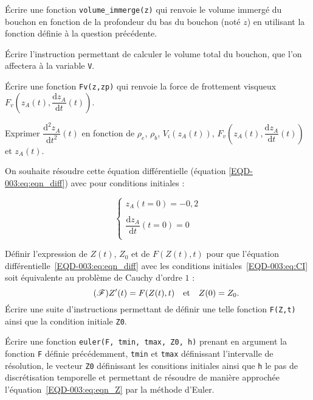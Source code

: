 \question{} Écrire une fonction \texttt{volume\_immerge(z)} qui renvoie le volume immergé du bouchon en fonction de la profondeur du bas du bouchon (noté $z$) en utilisant la fonction définie à la question précédente.

\question{} Écrire l'instruction permettant de calculer le volume total du bouchon, que l'on affectera à la variable \texttt V.

\question{} Écrire une fonction \texttt{Fv(z,zp)} qui renvoie la force de frottement visqueux $F_v\left(z_A(t),\dfrac{\mathrm{d}z_A}{\mathrm{d}t}(t)\right)$. 

\question{} Exprimer $\dfrac{\mathrm{d}^2z_A}{\mathrm{d}t^2}(t)$ en fonction de $\rho_{e}$, $\rho_b$, $V_i(z_A(t))$, $F_v\left(z_A(t),\dfrac{\mathrm{d}z_A}{\mathrm{d}t}(t)\right)$ et $z_A(t)$. 


On souhaite résoudre cette équation différentielle (équation \ref{EQD-003:eq:eqn_diff}) avec pour conditions initiales : 

\begin{equation}\tag{CI}\label{EQD-003:eq:CI}
\left\{
\begin{array}{l}
z_A(t=0)=-0,2\\
\\
\dfrac{\mathrm{d}z_A}{\mathrm{d}t}(t=0)=0\\
\end{array}
\right.
\end{equation}

\question{} Définir l'expression de $Z(t)$, $Z_0$ et de $F(Z(t),t)$ pour que l'équation différentielle~\eqref{EQD-003:eq:eqn_diff} avec les conditions initiales~\eqref{EQD-003:eq:CI} soit équivalente au problème de Cauchy d'ordre $1$ : 
\begin{equation}\tag{$\mathscr{F}$}\label{EQD-003:eq:eqn_Z}
    Z'(t)=F(Z(t),t)\quad\textrm{et}\quad Z(0) = Z_0.
\end{equation}
Écrire une suite d'instructions permettant de définir une telle fonction \texttt{F(Z,t)} ainsi que la condition initiale \texttt{Z0}.
 

\question{} Écrire une fonction \texttt{euler(F, tmin, tmax, Z0, h)} prenant en argument la fonction \texttt F définie précédemment, \texttt{tmin} et \texttt{tmax} définissant l'intervalle de résolution, le vecteur \texttt{Z0} définissant les consitions initiales ainsi que \texttt h le pas de discrétisation temporelle et permettant de résoudre de manière approchée l'équation~\eqref{EQD-003:eq:eqn_Z} par la méthode d'Euler.

